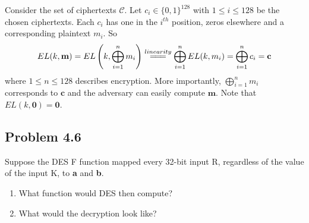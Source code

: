 \documentclass[../hw_sols.tex]{subfiles}
\begin{document}
\begin{solution}
Consider the set of ciphertexts $\mathcal{C}$. Let $c_i \in \{0,1\}^{128}$ with $1 \leq i \leq 128$ be the chosen ciphertexts.  Each $c_i$ has one in the $i^{th}$ position, zeros elsewhere and a corresponding plaintext $m_i$. So
	$$EL(k,\mathbf{m}) 
	= EL\left(k, \bigoplus_{i=1}^n m_i \right) 
	\stackrel{linearity}{=\joinrel=\joinrel=} \bigoplus_{i=1}^n EL(k,m_i) 
	= \bigoplus_{i=1}^n c_i
	 = \mathbf{c}$$
where $1 \leq n \leq 128$ describes encryption. More importantly, 
$\displaystyle \bigoplus_{i=1}^n m_i$ corresponds to $\mathbf{c}$ and the adversary can easily compute $\mathbf{m}$. Note that $EL(k,\mathbf{0}) = \mathbf{0}$.
\end{solution}


\newpage



\subsection*{Problem 4.6}
Suppose the DES F function mapped every 32-bit input R, regardless of the value of the input K, to \textbf{a} and \textbf{b}.
\begin{enumerate}
	\item What function would DES then compute?
	\item What would the decryption look like?
\end{enumerate}
\end{document}
